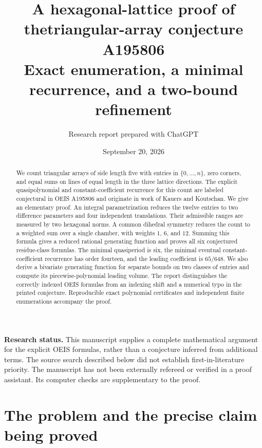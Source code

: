 \documentclass[11pt]{article}
\title{\textbf{A hexagonal-lattice proof of the\newline triangular-array conjecture A195806}\\[0.5em]
\large Exact enumeration, a minimal recurrence, and a two-bound refinement}
\author{Research report prepared with ChatGPT}
\date{September 20, 2026}
\numberwithin{equation}{section}
\theoremstyle{definition}
\begin{document}
\maketitle
\begin{abstract}
We count triangular arrays of side length five with entries in
$\{0,\ldots,n\}$, zero corners, and equal sums on lines of equal length in the
three lattice directions. The explicit quasipolynomial and constant-coefficient
recurrence for this count are labeled conjectural in OEIS A195806 and originate
in work of Kauers and Koutschan. We give an elementary proof. An integral
parametrization reduces the twelve entries to two difference parameters and
four independent translations. Their admissible ranges are measured by two
hexagonal norms. A common dihedral symmetry reduces the count to a weighted
sum over a single chamber, with weights $1$, $6$, and $12$. Summing this formula
gives a reduced rational generating function and proves all six conjectured
residue-class formulas. The minimal quasiperiod is six, the minimal eventual
constant-coefficient recurrence has order fourteen, and the leading coefficient
is $65/648$. We also derive a bivariate generating function for separate bounds
on two classes of entries and compute its piecewise-polynomial leading volume.
The report distinguishes the correctly indexed OEIS formulas from an indexing
shift and a numerical typo in the printed conjecture. Reproducible exact
polynomial certificates and independent finite enumerations accompany the
proof.
\end{abstract}

\noindent\textbf{Research status.}
This manuscript supplies a complete mathematical argument for the explicit
OEIS formulas, rather than a conjecture inferred from additional terms. The
source search described below did not establish first-in-literature priority.
The manuscript has not been externally refereed or verified in a proof
assistant. Its computer checks are supplementary to the proof.

\clearpage
\tableofcontents
\clearpage

\section{The problem and the precise claim being proved}
\label{sec:problem}
\end{document}
